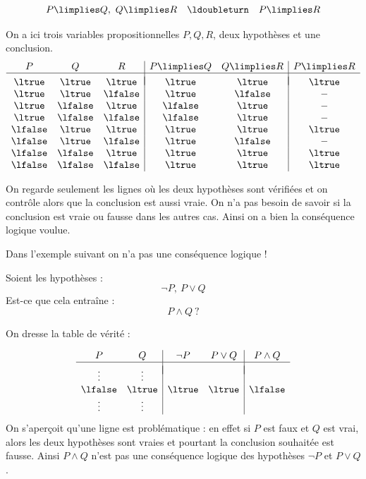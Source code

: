 \documentclass[11pt,class=report,crop=false]{standalone}
\begin{document}
\begin{exemple}
	\[
	P \limplies Q , \ Q \limplies R \quad \ldoubleturn \quad P \limplies R
	\]
	
	On a ici trois variables propositionnelles $P, Q, R$, deux hypothèses et une conclusion.
	\[
	\begin{array}{c c c | c c | c}
		P		& Q 		& R 		& P \limplies Q &  Q \limplies R &  P \limplies R \\
		\hline
		&&&&&	\\[-2ex]
		\ltrue 	& \ltrue 	& \ltrue 	& \ltrue		& \ltrue		& \ltrue \\
		\ltrue 	& \ltrue 	& \lfalse 	& \ltrue		& \lfalse		& - \\
		\ltrue 	& \lfalse 	& \ltrue 	& \lfalse		& \ltrue		& - \\	
		\ltrue 	& \lfalse 	& \lfalse 	& \lfalse 		& \ltrue		& - \\	
		\lfalse & \ltrue 	& \ltrue 	& \ltrue		& \ltrue 		& \ltrue \\
		\lfalse & \ltrue 	& \lfalse 	& \ltrue		& \lfalse		& - \\
		\lfalse & \lfalse 	& \ltrue 	& \ltrue		& \ltrue		& \ltrue \\	
		\lfalse & \lfalse 	& \lfalse 	& \ltrue 		& \ltrue		& \ltrue \\			
			
	\end{array}
	\]
	
	On regarde seulement les lignes où les deux hypothèses sont vérifiées et on contrôle alors que la conclusion est aussi vraie.
	On n'a pas besoin de savoir si la conclusion est vraie ou fausse dans les autres cas.
	Ainsi on a bien la conséquence logique voulue.
\end{exemple}

Dans l'exemple suivant on n'a pas une conséquence logique !

\begin{exemple}
	Soient les hypothèses :
	\[ \lnot P, \  P \lor Q \]
	Est-ce que cela entraîne :
	\[
	P \land Q \ ?
	\]
	

	On dresse la table de vérité :
	
	\[
	\begin{array}{c c | c c | c}
		P		& Q 		& \lnot P 		& P \lor Q 	&  P \land Q \\
		\hline
		&&&&	\\[-2ex]
		\vdots 	& \vdots 	& 				&  			&  \\
		\lfalse & \ltrue 	& \ltrue		& \ltrue	& \lfalse \\
		\vdots 	& \vdots 	& 				&  			&  \\	
	\end{array}
	\]
	On s'aperçoit qu'une ligne est problématique : en effet si $P$ est faux et $Q$ est vrai, alors les deux hypothèses sont vraies et pourtant la conclusion souhaitée est fausse.
	Ainsi $P \land Q$ n'est pas une conséquence logique des hypothèses $\lnot P$ et $P \lor Q$.

\end{exemple}
\end{document}

